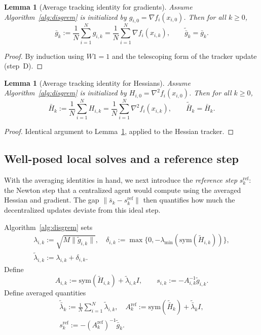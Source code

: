 \documentclass[11pt,a4paper]{article}
\def\one{1}%
\newtheorem{lemma}[theorem]{Lemma}
\newcommand{\one}{\mathbf{1}}
\begin{document}
\begin{lemma}[Average tracking identity for gradients]\label{lem:avg-track-g}
Assume Algorithm~\ref{alg:disgrem} is initialized by $g_{i,0}=\nabla f_i(x_{i,0})$.
Then for all $k\ge0$,
\[
\bar g_k:=\frac1N\sum_{i=1}^N g_{i,k}=\frac1N\sum_{i=1}^N\nabla f_i(x_{i,k}),
\qquad
\tilde{\bar g}_k=\bar g_k.
\]
\end{lemma}
\begin{proof}
By induction using $W\one=\one$ and the telescoping form of the tracker update (step~D).
\end{proof}

\begin{lemma}[Average tracking identity for Hessians]\label{lem:avg-track-h}
Assume Algorithm~\ref{alg:disgrem} is initialized by $H_{i,0}=\nabla^2 f_i(x_{i,0})$.
Then for all $k\ge0$,
\[
\bar H_k:=\frac1N\sum_{i=1}^N H_{i,k}=\frac1N\sum_{i=1}^N\nabla^2 f_i(x_{i,k}),
\qquad
\tilde{\bar H}_k=\bar H_k.
\]
\end{lemma}
\begin{proof}
Identical argument to Lemma~\ref{lem:avg-track-g}, applied to the Hessian tracker.
\end{proof}

\subsection{Well-posed local solves and a reference step}\label{ssec:refstep}
With the averaging identities in hand, we next introduce the
\emph{reference step} $s_k^{\mathrm{ref}}$: the Newton step that a
centralized agent would compute using the averaged Hessian and gradient.
The gap $\|\bar s_k - s_k^{\mathrm{ref}}\|$ then quantifies how much the
decentralized updates deviate from this ideal step.

Algorithm~\ref{alg:disgrem} sets
\begin{gather*}
\lambda_{i,k}:=\sqrt{M\|\tilde g_{i,k}\|},\quad
\delta_{i,k}:=\max\{0,-\lambda_{\min}(\mathrm{sym}(\tilde H_{i,k}))\},\\
\tilde\lambda_{i,k}:=\lambda_{i,k}+\delta_{i,k}.
\end{gather*}
Define
\[
A_{i,k}:=\mathrm{sym}(\tilde H_{i,k})+\tilde\lambda_{i,k}I,
\qquad
s_{i,k}:=-A_{i,k}^{-1}\tilde g_{i,k}.
\]
Define averaged quantities
\begin{gather*}
\tilde{\bar\lambda}_k:=\tfrac1N\textstyle\sum_{i=1}^N \tilde\lambda_{i,k},\quad
A_k^{\mathrm{ref}}:=\mathrm{sym}(\tilde{\bar H}_k)+\tilde{\bar\lambda}_k I,\\
s_k^{\mathrm{ref}}:=-(A_k^{\mathrm{ref}})^{-1}\tilde{\bar g}_k.
\end{gather*}
\end{document}
